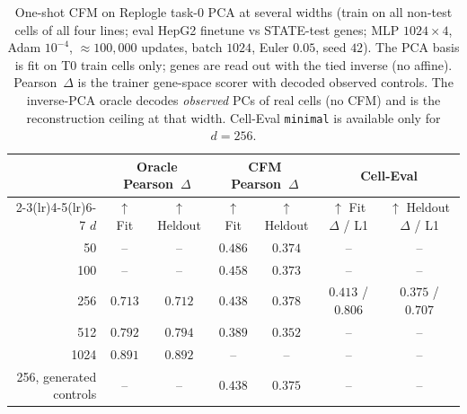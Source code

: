 \begin{table}[t]
\centering
\caption{One-shot CFM on Replogle task-0 PCA at several widths
(train on all non-test cells of all four lines; eval HepG2 finetune vs
STATE-test genes; MLP $1024{\times}4$, Adam $10^{-4}$, $\approx 100{,}000$
updates, batch $1024$, Euler $0.05$, seed $42$).
The PCA basis is fit on T0 train cells only; genes are read out with the
tied inverse (no affine).
Pearson~$\Delta$ is the trainer gene-space scorer with decoded observed
controls.
The inverse-PCA oracle decodes \emph{observed} PCs of real cells (no CFM)
and is the reconstruction ceiling at that width.
Cell-Eval \texttt{minimal} is available only for $d{=}256$.}
\label{tab:replogle_oneshot_pca_widths}
\begin{tabular}{r cc cc cc}
\toprule
 & \multicolumn{2}{c}{Oracle Pearson~$\Delta$}
 & \multicolumn{2}{c}{CFM Pearson~$\Delta$}
 & \multicolumn{2}{c}{Cell-Eval} \\
\cmidrule(lr){2-3}\cmidrule(lr){4-5}\cmidrule(lr){6-7}
$d$
 & $\uparrow$ Fit & $\uparrow$ Heldout
 & $\uparrow$ Fit & $\uparrow$ Heldout
 & $\uparrow$ Fit $\Delta$ / L1
 & $\uparrow$ Heldout $\Delta$ / L1 \\
\midrule
50
 & -- & --
 & $0.486$ & $0.374$
 & -- & -- \\
100
 & -- & --
 & $0.458$ & $0.373$
 & -- & -- \\
256
 & $0.713$ & $0.712$
 & $0.438$ & $0.378$
 & $0.413$ / $0.806$
 & $0.375$ / $0.707$ \\
512
 & $0.792$ & $0.794$
 & $0.389$ & $0.352$
 & -- & -- \\
1024
 & $0.891$ & $0.892$
 & -- & --
 & -- & -- \\
\midrule
256, generated controls
 & -- & --
 & $0.438$ & $0.375$
 & -- & -- \\
\bottomrule
\end{tabular}
\end{table}
